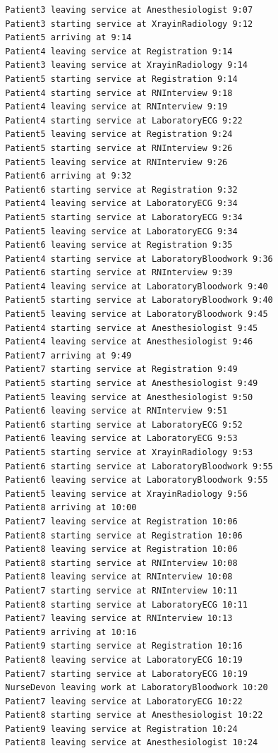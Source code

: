 \documentclass[12pt]{article}
\begin{document}
\begin{verbatim}
		Patient3 leaving service at Anesthesiologist 9:07
		Patient3 starting service at XrayinRadiology 9:12
		Patient5 arriving at 9:14
		Patient4 leaving service at Registration 9:14
		Patient3 leaving service at XrayinRadiology 9:14
		Patient5 starting service at Registration 9:14
		Patient4 starting service at RNInterview 9:18
		Patient4 leaving service at RNInterview 9:19
		Patient4 starting service at LaboratoryECG 9:22
		Patient5 leaving service at Registration 9:24
		Patient5 starting service at RNInterview 9:26
		Patient5 leaving service at RNInterview 9:26
		Patient6 arriving at 9:32
		Patient6 starting service at Registration 9:32
		Patient4 leaving service at LaboratoryECG 9:34
		Patient5 starting service at LaboratoryECG 9:34
		Patient5 leaving service at LaboratoryECG 9:34
		Patient6 leaving service at Registration 9:35
		Patient4 starting service at LaboratoryBloodwork 9:36
		Patient6 starting service at RNInterview 9:39
		Patient4 leaving service at LaboratoryBloodwork 9:40
		Patient5 starting service at LaboratoryBloodwork 9:40
		Patient5 leaving service at LaboratoryBloodwork 9:45
		Patient4 starting service at Anesthesiologist 9:45
		Patient4 leaving service at Anesthesiologist 9:46
		Patient7 arriving at 9:49
		Patient7 starting service at Registration 9:49
		Patient5 starting service at Anesthesiologist 9:49
		Patient5 leaving service at Anesthesiologist 9:50
		Patient6 leaving service at RNInterview 9:51
		Patient6 starting service at LaboratoryECG 9:52
		Patient6 leaving service at LaboratoryECG 9:53
		Patient5 starting service at XrayinRadiology 9:53
		Patient6 starting service at LaboratoryBloodwork 9:55
		Patient6 leaving service at LaboratoryBloodwork 9:55
		Patient5 leaving service at XrayinRadiology 9:56
		Patient8 arriving at 10:00
		Patient7 leaving service at Registration 10:06
		Patient8 starting service at Registration 10:06
		Patient8 leaving service at Registration 10:06
		Patient8 starting service at RNInterview 10:08
		Patient8 leaving service at RNInterview 10:08
		Patient7 starting service at RNInterview 10:11
		Patient8 starting service at LaboratoryECG 10:11
		Patient7 leaving service at RNInterview 10:13
		Patient9 arriving at 10:16
		Patient9 starting service at Registration 10:16
		Patient8 leaving service at LaboratoryECG 10:19
		Patient7 starting service at LaboratoryECG 10:19
		NurseDevon leaving work at LaboratoryBloodwork 10:20
		Patient7 leaving service at LaboratoryECG 10:22
		Patient8 starting service at Anesthesiologist 10:22
		Patient9 leaving service at Registration 10:24
		Patient8 leaving service at Anesthesiologist 10:24

\end{verbatim}
\end{document}
